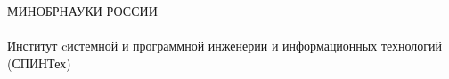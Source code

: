 \thispagestyle{empty}


\begin{center}
МИНОБРНАУКИ РОССИИ\\
\thesisOrganization
\\
Институт cистемной и программной инженерии и информационных технологий (СПИНТех)
\end{center}
%
\vspace{0pt plus4fill} %
%
%
\vspace{0pt plus6fill} %
\begin{center}
{\large \thesisAuthor}
\end{center}
%
\vspace{0pt plus1fill} %
